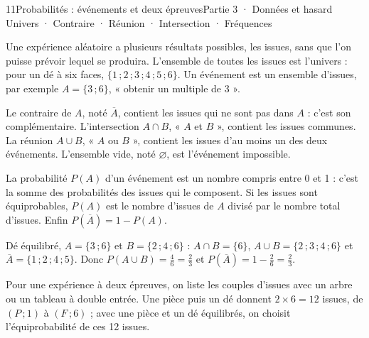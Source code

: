 \begin{ouverture}[probabilites]{11}{Probabilités : événements et deux épreuves}{Partie 3 · Données et hasard}
{Univers · Contraire · Réunion · Intersection · Fréquences}
\end{ouverture}
\pagestyle{otMain}\essentiel\fontsize{11}{15}\selectfont
{}\label{cours-11-1}
\begin{definition}Une expérience aléatoire a plusieurs résultats possibles, les issues, sans que l’on puisse prévoir lequel se produira. L’ensemble de toutes les issues est l’univers : pour un dé à six faces, $\{1\,;2\,;3\,;4\,;5\,;6\}$. Un événement est un ensemble d’issues, par exemple $A=\{3\,;6\}$, « obtenir un multiple de 3 ».\end{definition}
\begin{definition}Le contraire de $A$, noté $\overline{A}$, contient les issues qui ne sont pas dans $A$ : c’est son complémentaire. L’intersection $A\cap B$, « $A$ et $B$ », contient les issues communes. La réunion $A\cup B$, « $A$ ou $B$ », contient les issues d’au moins un des deux événements. L’ensemble vide, noté $\varnothing$, est l’événement impossible.\end{definition}
\begin{propriete}La probabilité $P(A)$ d’un événement est un nombre compris entre 0 et 1 : c’est la somme des probabilités des issues qui le composent. Si les issues sont équiprobables, $P(A)$ est le nombre d’issues de $A$ divisé par le nombre total d’issues. Enfin $P(\overline A)=1-P(A)$.\end{propriete}
\begin{exemple}Dé équilibré, $A=\{3\,;6\}$ et $B=\{2\,;4\,;6\}$ : $A\cap B=\{6\}$, $A\cup B=\{2\,;3\,;4\,;6\}$ et $\overline A=\{1\,;2\,;4\,;5\}$. Donc $P(A\cup B)=\frac46=\frac23$ et $P(\overline A)=1-\frac26=\frac23$.\end{exemple}
\clearpage
{}\label{cours-11-2}
\begin{savoirfaire}Pour une expérience à deux épreuves, on liste les couples d’issues avec un arbre ou un tableau à double entrée. Une pièce puis un dé donnent $2\times6=12$ issues, de $(P\,;1)$ à $(F\,;6)$ ; avec une pièce et un dé équilibrés, on choisit l’équiprobabilité de ces 12 issues.\end{savoirfaire}
\label{fig-cours-11-2-cours-arbre-pieces}


